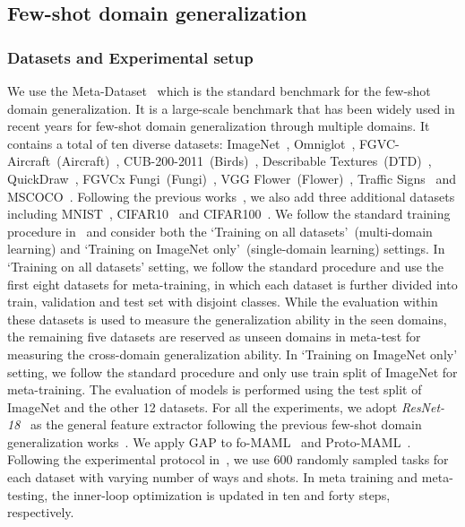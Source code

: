 \subsection{Few-shot domain generalization}
\subsubsection{Datasets and Experimental setup}
We use the Meta-Dataset~\cite{triantafillou2019meta} which is the standard benchmark for the few-shot domain generalization. It is a large-scale benchmark that has been widely used in recent years for few-shot domain generalization through multiple domains. It contains a total of ten diverse datasets: ImageNet~\cite{russakovsky2015imagenet}, Omniglot~\cite{lake2015human}, FGVC-Aircraft~(Aircraft)~\cite{maji2013fine}, CUB-200-2011~(Birds)~\cite{wah2011caltech}, Describable Textures~(DTD)~\cite{cimpoi2014describing}, QuickDraw~\cite{jongejan2016quick}, FGVCx Fungi~(Fungi)~\cite{schroeder2018fgvcx}, VGG Flower~(Flower)~\cite{nilsback2008automated}, Traffic Signs~\cite{houben2013detection} and MSCOCO~\cite{lin2014microsoft}.
Following the previous works~\cite{requeima2019fast, bateni2020improved, li2021universal, triantafillou2021learning, li2022cross}, we also add three additional datasets including MNIST~\cite{lecun1998gradient}, CIFAR10~\cite{krizhevsky2009learning} and CIFAR100~\cite{krizhevsky2009learning}.
We follow the standard training procedure in~\cite{triantafillou2019meta} and consider both the `Training on all datasets'~(multi-domain learning) and `Training on ImageNet only'~(single-domain learning) settings. 
In ‘Training on all datasets’ setting, we follow the standard procedure and use the first eight datasets for meta-training, in which each dataset is further divided into train, validation and test set with disjoint classes.
While the evaluation within these datasets is used to measure the generalization ability in the seen domains, the remaining five datasets are reserved as unseen domains in meta-test for measuring the cross-domain generalization ability. In `Training on ImageNet only' setting, we follow the standard procedure and only use train split of ImageNet for meta-training. The evaluation of models is performed using the test split of ImageNet and the other 12 datasets. For all the experiments, we adopt \textit{ResNet-18}~\cite{he2016deep} as the general feature extractor following the previous few-shot domain generalization works~\cite{requeima2019fast, bateni2020improved, li2021universal, triantafillou2021learning, li2022cross}. We apply GAP to fo-MAML~\cite{finn2017model} and Proto-MAML~\cite{triantafillou2019meta}. Following the experimental protocol in~\cite{triantafillou2019meta}, we use 600 randomly sampled tasks for each dataset with varying number of ways and shots. In meta training and meta-testing, the inner-loop optimization is updated in ten and forty steps, respectively.

